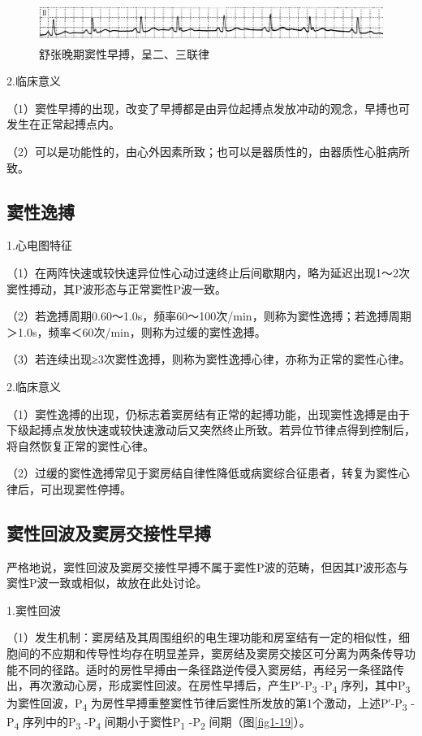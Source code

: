 \begin{figure}[!htbp]
 \centering
 \includegraphics[width=5.78125in,height=0.51042in]{./images/Image00024.jpg}
 \captionsetup{justification=centering}
 \caption{舒张晚期窦性早搏，呈二、三联律}
 \label{fig1-18}
  \end{figure} 

2.临床意义

（1）窦性早搏的出现，改变了早搏都是由异位起搏点发放冲动的观念，早搏也可发生在正常起搏点内。

（2）可以是功能性的，由心外因素所致；也可以是器质性的，由器质性心脏病所致。

\protect\hypertarget{text00007.htmlux5cux23subid17}{}{}

\subsection{窦性逸搏}

1.心电图特征

（1）在两阵快速或较快速异位性心动过速终止后间歇期内，略为延迟出现1～2次窦性搏动，其P波形态与正常窦性P波一致。

（2）若逸搏周期0.60～1.0s，频率60～100次/min，则称为窦性逸搏；若逸搏周期＞1.0s，频率＜60次/min，则称为过缓的窦性逸搏。

（3）若连续出现≥3次窦性逸搏，则称为窦性逸搏心律，亦称为正常的窦性心律。

2.临床意义

（1）窦性逸搏的出现，仍标志着窦房结有正常的起搏功能，出现窦性逸搏是由于下级起搏点发放快速或较快速激动后又突然终止所致。若异位节律点得到控制后，将自然恢复正常的窦性心律。

（2）过缓的窦性逸搏常见于窦房结自律性降低或病窦综合征患者，转复为窦性心律后，可出现窦性停搏。

\protect\hypertarget{text00007.htmlux5cux23subid18}{}{}

\subsection{窦性回波及窦房交接性早搏}

严格地说，窦性回波及窦房交接性早搏不属于窦性P波的范畴，但因其P波形态与窦性P波一致或相似，故放在此处讨论。

1.窦性回波

（1）发生机制：窦房结及其周围组织的电生理功能和房室结有一定的相似性，细胞间的不应期和传导性均存在明显差异，窦房结及窦房交接区可分离为两条传导功能不同的径路。适时的房性早搏由一条径路逆传侵入窦房结，再经另一条径路传出，再次激动心房，形成窦性回波。在房性早搏后，产生P′-P\textsubscript{3}
-P\textsubscript{4} 序列，其中P\textsubscript{3}
为窦性回波，P\textsubscript{4}
为房性早搏重整窦性节律后窦性所发放的第1个激动，上述P′-P\textsubscript{3}
-P\textsubscript{4} 序列中的P\textsubscript{3} -P\textsubscript{4}
间期小于窦性P\textsubscript{1} -P\textsubscript{2} 间期（图\ref{fig1-19}）。

